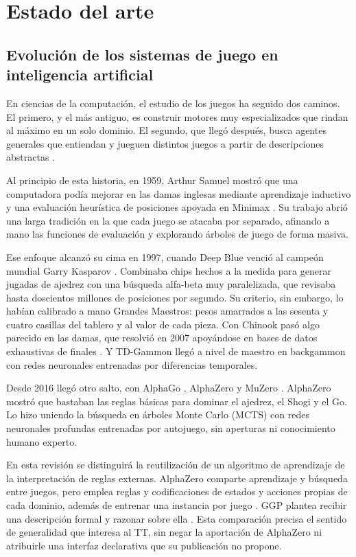 \chapter{Estado del arte}
\label{ch:2}

\section{Evolución de los sistemas de juego en inteligencia artificial}

En ciencias de la computación, el estudio de los juegos ha seguido dos caminos. El primero, y el más antiguo, es construir motores muy especializados que rindan al máximo en un solo dominio. El segundo, que llegó después, busca agentes generales que entiendan y jueguen distintos juegos a partir de descripciones abstractas \cite{RussellNorvig2010}.

Al principio de esta historia, en 1959, Arthur Samuel mostró que una computadora podía mejorar en las damas inglesas mediante aprendizaje inductivo y una evaluación heurística de posiciones apoyada en Minimax \cite{Samuel1959}. Su trabajo abrió una larga tradición en la que cada juego se atacaba por separado, afinando a mano las funciones de evaluación y explorando árboles de juego de forma masiva.

Ese enfoque alcanzó su cima en 1997, cuando Deep Blue venció al campeón mundial Garry Kasparov \cite{Campbell2002DeepBlue}. Combinaba chips hechos a la medida para generar jugadas de ajedrez con una búsqueda alfa-beta muy paralelizada, que revisaba hasta doscientos millones de posiciones por segundo. Su criterio, sin embargo, lo habían calibrado a mano Grandes Maestros: pesos amarrados a las sesenta y cuatro casillas del tablero y al valor de cada pieza. Con Chinook pasó algo parecido en las damas, que resolvió en 2007 apoyándose en bases de datos exhaustivas de finales \cite{Schaeffer2007Checkers}. Y TD-Gammon llegó a nivel de maestro en backgammon con redes neuronales entrenadas por diferencias temporales.

Desde 2016 llegó otro salto, con AlphaGo \cite{Silver2016AlphaGo}, AlphaZero \cite{Silver2018AlphaZero} y MuZero \cite{Schrittwieser2020MuZero}. AlphaZero mostró que bastaban las reglas básicas para dominar el ajedrez, el Shogi y el Go. Lo hizo uniendo la búsqueda en árboles Monte Carlo (MCTS) con redes neuronales profundas entrenadas por autojuego, sin aperturas ni conocimiento humano experto.

En esta revisión se distinguirá la reutilización de un algoritmo de aprendizaje de la interpretación de reglas externas. AlphaZero comparte aprendizaje y búsqueda entre juegos, pero emplea reglas y codificaciones de estados y acciones propias de cada dominio, además de entrenar una instancia por juego \cite{Silver2018AlphaZero}. GGP plantea recibir una descripción formal y razonar sobre ella \cite{Genesereth2005GGP}. Esta comparación precisa el sentido de generalidad que interesa al TT, sin negar la aportación de AlphaZero ni atribuirle una interfaz declarativa que su publicación no propone.

